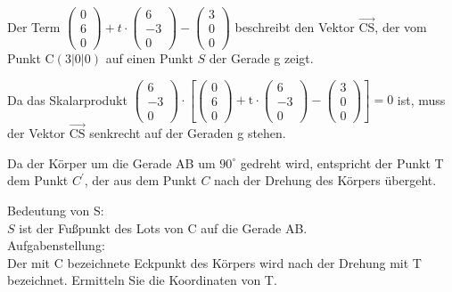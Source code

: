 \documentclass[10pt]{article}
\begin{document}
Der Term $\left(\begin{array}{l}0 \\ 6 \\ 0\end{array}\right)+t \cdot\left(\begin{array}{c}6 \\ -3 \\ 0\end{array}\right)-\left(\begin{array}{l}3 \\ 0 \\ 0\end{array}\right)$ beschreibt den Vektor $\overrightarrow{\mathrm{CS}}$, der vom Punkt $\mathrm{C}(3|0| 0)$ auf einen Punkt $S$ der Gerade g zeigt.

Da das Skalarprodukt $\left(\begin{array}{c}6 \\ -3 \\ 0\end{array}\right) \cdot\left[\left(\begin{array}{l}0 \\ 6 \\ 0\end{array}\right)+\mathrm{t} \cdot\left(\begin{array}{c}6 \\ -3 \\ 0\end{array}\right)-\left(\begin{array}{l}3 \\ 0 \\ 0\end{array}\right)\right]=0$ ist, muss der Vektor $\overrightarrow{\mathrm{CS}}$ senkrecht auf der Geraden g stehen.

Da der Körper um die Gerade AB um $90^{\circ}$ gedreht wird, entspricht der Punkt T dem Punkt $C^{\prime}$, der aus dem Punkt $C$ nach der Drehung des Körpers übergeht.

Bedeutung von S:\\
$S$ ist der Fußpunkt des Lots von C auf die Gerade AB.\\
Aufgabenstellung:\\
Der mit C bezeichnete Eckpunkt des Körpers wird nach der Drehung mit T bezeichnet. Ermitteln Sie die Koordinaten von T.
\end{document}
